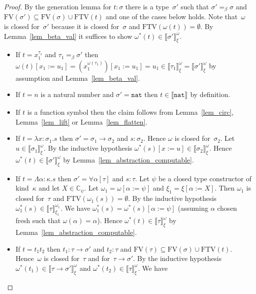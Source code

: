 \documentclass[runningheads,a4paper]{llncs}
\newcommand{\arrtype}{\rightarrow}
\newcommand{\abs}[2]{\lambda #1.#2}
\newcommand{\tabs}[2]{\Lambda #1.#2}
\newcommand{\subst}[2]{#1:=#2}
\newcommand{\FTV}{\mathrm{FTV}}
\newcommand{\FV}{\mathrm{FV}}
\newcommand{\nat}{\mathtt{nat}}
\newcommand{\Cb}{\mathbb{C}}
\newcommand{\val}[3]{\ensuremath{\llbracket#1\rrbracket_{#2}^{#3}}}
\begin{document}
\begin{proof}
  By the generation lemma for $t : \sigma$ there is a type~$\sigma'$
  such that $\sigma' =_\beta \sigma$ and
  $\FV(\sigma') \subseteq \FV(\sigma) \cup \FTV(t)$ and one of the
  cases below holds. Note that~$\omega$ is closed for~$\sigma'$
  because it is closed for~$\sigma$ and $\FTV(\omega(t)) =
  \emptyset$. By Lemma~\ref{lem_beta_val} it suffices to show
  $\omega^*(t) \in \val{\sigma'}{\xi}{\omega}$.
  \begin{itemize}
  \item If $t = x_1^{\tau_1}$ and $\tau_1 =_\beta \sigma'$ then
    $\omega(t)[\subst{x_1}{u_1}] =
    (x_1^{\omega(\tau_1)})[\subst{x_1}{u_1}] = u_1 \in
    \val{\tau_1}{\xi}{\omega} = \val{\sigma'}{\xi}{\omega}$ by
    assumption and Lemma~\ref{lem_beta_val}.
  \item If $t = n$ is a natural number and $\sigma' = \nat$ then $t
    \in \val{\nat}{}{}$ by definition.
  \item If $t$ is a function symbol then the claim follows from
    Lemma~\ref{lem_circ}, Lemma~\ref{lem_lift} or
    Lemma~\ref{lem_flatten}.
  \item If $t = \abs{x:\sigma_1}{s}$ then
    $\sigma' = \sigma_1\arrtype\sigma_2$ and $s : \sigma_2$. Hence
    $\omega$ is closed for~$\sigma_2$. Let
    $u \in \val{\sigma_1}{\xi}{\omega}$. By the inductive hypothesis
    $\omega^*(s)[\subst{x}{u}] \in \val{\sigma_2}{\xi}{\omega}$. Hence
    $\omega^*(t) \in \val{\sigma'}{\xi}{\omega}$ by
    Lemma~\ref{lem_abstraction_computable}.
  \item If $t = \tabs{\alpha:\kappa}{s}$ then $\sigma' =
    \forall\alpha[\tau]$ and $s : \tau$. Let $\psi$ be a closed type
    constructor of kind~$\kappa$ and let $X \in \Cb_\psi$. Let
    $\omega_1 = \omega[\subst{\alpha}{\psi}]$ and
    $\xi_1=\xi[\subst{\alpha}{X}]$. Then $\omega_1$ is closed
    for~$\tau$ and $\FTV(\omega_1(s)) = \emptyset$. By the inductive
    hypothesis $\omega_1^*(s) \in \val{\tau}{\xi_1}{\omega_1}$. We
    have $\omega_1^*(s) = \omega^*(s)[\subst{\alpha}{\psi}]$ (assuming
    $\alpha$ chosen fresh such that $\omega(\alpha) = \alpha$). Hence
    $\omega^*(t) \in \val{\tau}{\xi}{\omega}$ by
    Lemma~\ref{lem_abstraction_computable}.
  \item If $t = t_1 t_2$ then $t_1 : \tau\arrtype\sigma'$ and
    $t_2 : \tau$ and $\FV(\tau) \subseteq \FV(\sigma) \cup
    \FTV(t)$. Hence~$\omega$ is closed for~$\tau$ and
    for~$\tau\arrtype\sigma'$. By the inductive hypothesis
    $\omega^*(t_1) \in \val{\tau\arrtype\sigma'}{\xi}{\omega}$ and
    $\omega^*(t_2) \in \val{\tau}{\xi}{\omega}$. We have

\end{itemize}
\end{proof}
\end{document}
